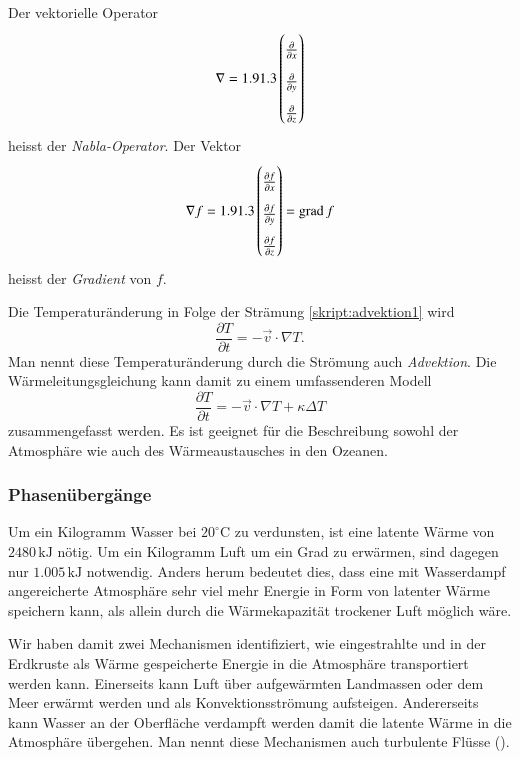 \begin{definition}
Der vektorielle Operator 
\[
\nabla
=
\arraystretch{1.3}
\begin{pmatrix}
\frac{\partial}{\partial x}\\
\frac{\partial}{\partial y}\\
\frac{\partial}{\partial z}
\end{pmatrix}
\]
heisst der {\em Nabla-Operator}.
Der Vektor
\[
\nabla f
=
\arraystretch{1.3}
\begin{pmatrix}
\frac{\partial f}{\partial x}\\
\frac{\partial f}{\partial y}\\
\frac{\partial f}{\partial z}
\end{pmatrix}
=
\operatorname{grad} f
\]
heisst der {\em Gradient} von $f$.
\end{definition}
%
%

Die Temperaturänderung in Folge der Strämung 
\eqref{skript:advektion1}
wird 
\begin{equation}
\frac{\partial T}{\partial t}
=
-\vec{v}\cdot\nabla T.
\label{skript:advektion2}
\end{equation}
%
Man nennt diese Temperaturänderung durch die Strömung auch
{\em Advektion}.
Die Wärmeleitungsgleichung kann damit zu einem umfassenderen
Modell
\begin{equation}
\frac{\partial T}{\partial t}
=
-\vec{v}\cdot\nabla T +\kappa\Delta T
\label{skript:waermeleitungadvektion}
\end{equation}
zusammengefasst werden.
Es ist geeignet für die Beschreibung sowohl der Atmosphäre wie auch des
Wärmeaustausches in den Ozeanen.

\subsubsection{Phasenübergänge}
Um ein Kilogramm Wasser bei $20^\circ\text{C}$ zu verdunsten, ist eine
latente Wärme von $2480\,\text{kJ}$ nötig.
Um ein Kilogramm Luft um ein Grad zu erwärmen, sind dagegen nur
$1.005\,\text{kJ}$ notwendig.
Anders herum bedeutet dies, dass eine mit Wasserdampf angereicherte Atmosphäre
sehr viel mehr Energie in Form von latenter Wärme speichern kann, als
allein durch die Wärmekapazität trockener Luft möglich wäre.

Wir haben damit zwei Mechanismen identifiziert, wie eingestrahlte
und in der Erdkruste als Wärme gespeicherte Energie in die Atmosphäre 
transportiert werden kann.
Einerseits kann Luft über aufgewärmten Landmassen oder dem Meer erwärmt
werden und als Konvektionsströmung aufsteigen.
Andererseits kann Wasser an der Oberfläche verdampft werden damit die
latente Wärme in die Atmosphäre übergehen.
Man nennt diese Mechanismen auch turbulente Flüsse
(\cite[S.~70]{skript:wiefunktioniertdas}).

